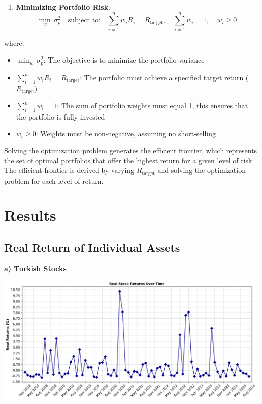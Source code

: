 \documentclass[
]{article}
\providecommand{\tightlist}{%
  \setlength{\itemsep}{0pt}\setlength{\parskip}{0pt}}
\begin{document}
\begin{enumerate}
\def\labelenumi{\arabic{enumi}.}
\setcounter{enumi}{2}
\tightlist
\item
  \textbf{Minimizing Portfolio Risk}: \[
  \min_{w} \, \sigma_p^2 \quad \text{subject to:} \quad \sum_{i=1}^{n} w_i R_i = R_{\text{target}}, \quad \sum_{i=1}^{n} w_i = 1, \quad w_i \geq 0
  \]
\end{enumerate}

where:

\begin{itemize}
\tightlist
\item
  \(\min_{w} \, \sigma_p^2\): The objective is to minimize the portfolio
  variance
\item
  \(\sum_{i=1}^{n} w_i R_i = R_{\text{target}}\): The portfolio must
  achieve a specified target return (\(R_{\text{target}}\))
\item
  \(\sum_{i=1}^{n} w_i = 1\): The sum of portfolio weights must equal 1,
  this ensures that the portfolio is fully invested
\item
  \(w_i \geq 0\): Weights must be non-negative, assuming no
  short-selling
\end{itemize}

Solving the optimization problem generates the efficient frontier, which
represents the set of optimal portfolios that offer the highest return
for a given level of risk. The efficient frontier is derived by varying
\(R_{\text{target}}\) and solving the optimization problem for each
level of return.

\section{Results}\label{results}
\subsection{Real Return of Individual Assets}
\textbf{a) Turkish Stocks}

\includegraphics[width=\textwidth]{real_stock_returns.png}
\end{document}
